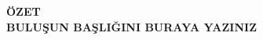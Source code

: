 
\begin{center}
    \textbf{ÖZET} \\
    \vspace{1em}
    \textbf{BULUŞUN BAŞLIĞINI BURAYA YAZINIZ}
\end{center}


